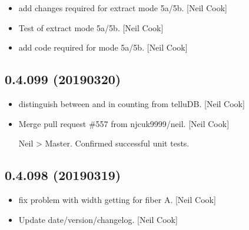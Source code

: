 \documentclass[a4paper,10pt,english]{report}
\begin{document}
\begin{itemize}
\item {} 
 \sphinxhyphen{} add changes required for extract mode 5a/5b. {[}Neil
Cook{]}

\item {} 
Test of extract mode 5a/5b. {[}Neil Cook{]}

\item {} 
 \sphinxhyphen{} add code required for mode 5a/5b. {[}Neil
Cook{]}

\end{itemize}


\subsection{0.4.099 (2019\sphinxhyphen{}03\sphinxhyphen{}20)}
\label{\detokenize{misc/changelog:id180}}\begin{itemize}
\item {} 
 \sphinxhyphen{} distinguish between  and 
in counting from telluDB. {[}Neil Cook{]}

\item {} 
Merge pull request \#557 from njcuk9999/neil. {[}Neil Cook{]}

Neil \textendash{}\textgreater{} Master. Confirmed successful unit tests.

\end{itemize}


\subsection{0.4.098 (2019\sphinxhyphen{}03\sphinxhyphen{}19)}
\label{\detokenize{misc/changelog:id181}}\begin{itemize}
\item {} 
 \sphinxhyphen{} fix problem with width getting for fiber
A. {[}Neil Cook{]}

\item {} 
Update date/version/changelog. {[}Neil Cook{]}

\end{itemize}
\end{document}
